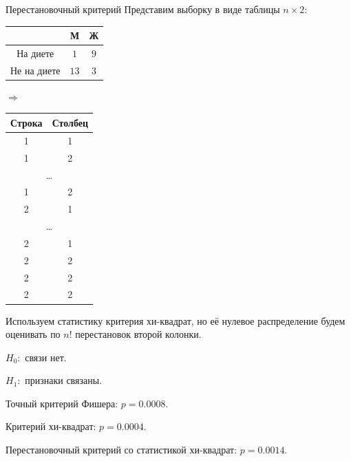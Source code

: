 \documentclass[9pt,pdf,utf8,hyperref={unicode},aspectratio=169]{beamer}
\begin{document}
\begin{frame}{Перестановочный критерий}
	Представим выборку в виде таблицы $n\times 2$:
	\begin{center}
	{\begin{tabular}{|c|c|c|}\hline
					&М  &Ж \\\hline
		На диете    &$1$  &$9$ \\\hline
		Не на диете &$13$ &$3$ \\\hline
	\end{tabular}	$\Rightarrow$
	\begin{tabular}{|c|c|}\hline
	Строка & Столбец \\\hline
	1      & 1 \\
	1      & 2 \\
	\multicolumn{2}{|c|}{\dots} \\
	1      & 2 \\
	2      & 1 \\
	\multicolumn{2}{|c|}{\dots} \\
	2      & 1 \\
	2      & 2 \\
	2      & 2 \\
	2      & 2 \\ \hline
	\end{tabular}}
	\end{center}
	
	Используем статистику критерия хи-квадрат, но её нулевое распределение будем оценивать по $n!$ перестановок второй колонки.
		
		\bigskip
		
		$H_0\colon$ связи нет.
		
		$H_1\colon$ признаки связаны.
		
		Точный критерий Фишера: $p = 0.0008.$	
		
		Критерий хи-квадрат: $p = 0.0004.$	
		
		Перестановочный критерий со статистикой хи-квадрат: $p = 0.0014.$	
\end{frame}
\end{document}
